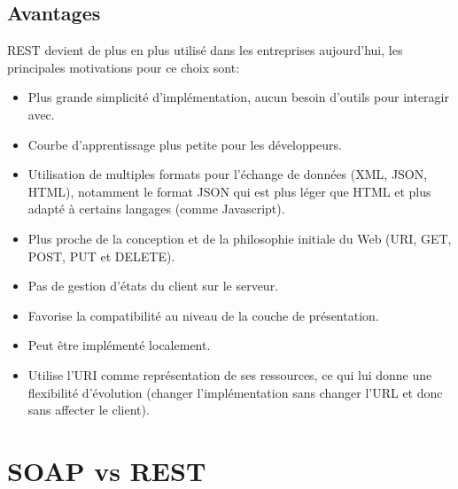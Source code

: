 \subsection{Avantages}
REST devient de plus en plus utilisé dans les entreprises aujourd'hui, les principales motivations pour ce choix sont:\cite{refSOAPvsREST}
\begin{itemize}
	\item Plus grande simplicité d'implémentation, aucun besoin d'outils pour interagir avec.
	\item Courbe d'apprentissage plus petite pour les développeurs.
	\item Utilisation de multiples formats pour l'échange de données (XML, JSON, HTML), notamment le format JSON qui est plus léger que HTML et plus adapté à certains langages (comme Javascript).
	\item Plus proche de la conception et de la philosophie initiale du Web (URI, GET, POST, PUT et DELETE).
	\item Pas de gestion d'états du client sur le serveur.
	\item Favorise la compatibilité au niveau de la couche de présentation.
	\item Peut être implémenté localement.
	\item Utilise l'URI comme représentation de ses ressources, ce qui lui donne une flexibilité d'évolution (changer l'implémentation sans changer l'URL et donc sans affecter le client).
\end{itemize}

\section{SOAP vs REST}

